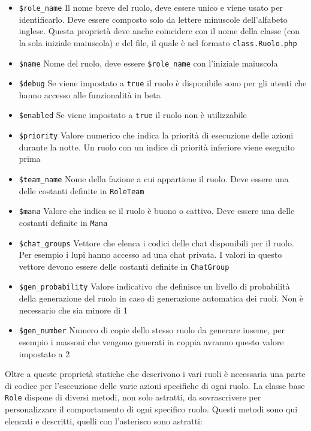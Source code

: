 \begin{itemize}
	\item \texttt{\$role\_name} Il nome breve del ruolo, deve essere unico e viene usato per identificarlo. Deve essere composto solo da lettere minuscole dell'alfabeto inglese. Questa proprietà deve anche coincidere con il nome della classe (con la sola iniziale maiuscola) e del file, il quale è nel formato \texttt{class.Ruolo.php}
	\item \texttt{\$name} Nome del ruolo, deve essere \texttt{\$role\_name} con l'iniziale maiuscola
	\item \texttt{\$debug} Se viene impostato a \texttt{true} il ruolo è disponibile sono per gli utenti che hanno accesso alle funzionalità in beta
	\item \texttt{\$enabled} Se viene impostato a \texttt{true} il ruolo non è utilizzabile
	\item \texttt{\$priority} Valore numerico che indica la priorità di esecuzione delle azioni durante la notte. Un ruolo con un indice di priorità inferiore viene eseguito prima
	\item \texttt{\$team\_name} Nome della fazione a cui appartiene il ruolo. Deve essere una delle costanti definite in \texttt{RoleTeam}
	\item \texttt{\$mana} Valore che indica se il ruolo è buono o cattivo. Deve essere una delle costanti definite in \texttt{Mana}
	\item \texttt{\$chat\_groups} Vettore che elenca i codici delle chat disponibili per il ruolo. Per esempio i lupi hanno accesso ad una chat privata. I valori in questo vettore devono essere delle costanti definite in \texttt{ChatGroup}
	\item \texttt{\$gen\_probability} Valore indicativo che definisce un livello di probabilità della generazione del ruolo in caso di generazione automatica dei ruoli. Non è necessario che sia minore di 1
	\item \texttt{\$gen\_number} Numero di copie dello stesso ruolo da generare inseme, per esempio i massoni che vengono generati in coppia avranno questo valore impostato a 2
\end{itemize}

Oltre a queste proprietà statiche che descrivono i vari ruoli è necessaria una parte di codice per l'esecuzione delle varie azioni specifiche di ogni ruolo. La classe base \texttt{Role} dispone di diversi metodi, non solo astratti, da sovrascrivere per personalizzare il comportamento di ogni specifico ruolo. Questi metodi sono qui elencati e descritti, quelli con l'asterisco sono astratti:

